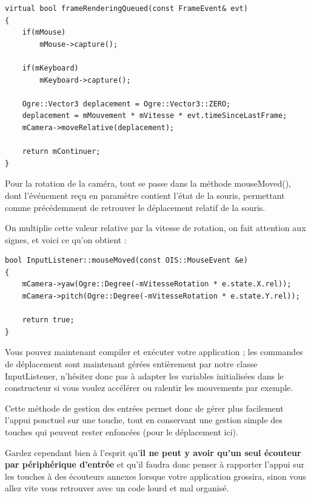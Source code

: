 \documentclass[10pt,a4paper]{report}
\begin{document}
\begin{lstlisting}[caption={Impl\'ementation du d\'eplacement de la cam\'era dans la m\'ethode frameRenderingQueued}]
virtual bool frameRenderingQueued(const FrameEvent& evt)
{
    if(mMouse)
        mMouse->capture();

    if(mKeyboard)
        mKeyboard->capture();

    Ogre::Vector3 deplacement = Ogre::Vector3::ZERO;
    deplacement = mMouvement * mVitesse * evt.timeSinceLastFrame;
    mCamera->moveRelative(deplacement);

    return mContinuer;
}
\end{lstlisting}

Pour la rotation de la cam\'era, tout se passe dans la m\'ethode mouseMoved(), dont l'\'ev\'enement re\c{c}u en param\`etre contient l'\'etat de la souris, permettant comme pr\'ec\'edemment de retrouver le d\'eplacement relatif de la souris.

On multiplie cette valeur relative par la vitesse de rotation, on fait attention aux signes, et voici ce qu'on obtient :

\begin{lstlisting}[caption={Impl\'ementation de la rotation de la cam\'era dans la m\'ethode mouseMoved}]
bool InputListener::mouseMoved(const OIS::MouseEvent &e)
{
    mCamera->yaw(Ogre::Degree(-mVitesseRotation * e.state.X.rel));
    mCamera->pitch(Ogre::Degree(-mVitesseRotation * e.state.Y.rel));

    return true;
}
\end{lstlisting}

Vous pouvez maintenant compiler et ex\'ecuter votre application ; les commandes de d\'eplacement sont maintenant g\'er\'ees enti\`erement par notre classe InputListener, n'h\'esitez donc pas \`a adapter les variables initialis\'ees dans le constructeur si vous voulez acc\'el\'erer ou ralentir les mouvements par exemple.\newline

Cette m\'ethode de gestion des entr\'ees permet donc de g\'erer plus facilement l'appui ponctuel sur une touche, tout en conservant une gestion simple des touches qui peuvent rester enfonc\'ees (pour le d\'eplacement ici).

Gardez cependant bien \`a l'esprit qu'\textbf{il ne peut y avoir qu'un seul \'ecouteur par p\'eriph\'erique d'entr\'ee} et qu'il faudra donc penser \`a rapporter l'appui sur les touches \`a des \'ecouteurs annexes lorsque votre application grossira, sinon vous allez vite vous retrouver avec un code lourd et mal organis\'e.\newline
\end{document}
